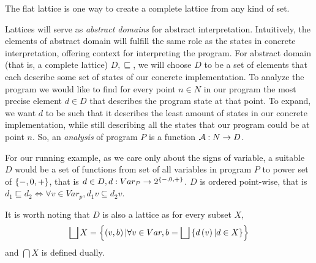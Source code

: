 \documentclass[..thesis.tex]{subfiles}
\begin{document}
The flat lattice is one way to create a complete lattice from any kind of set.


Lattices will serve as \textit{abstract domains} for abstract interpretation. Intuitively, the elements of abstract domain will fulfill the same role as the states in concrete interpretation, offering context for interpreting the program. For abstract domain (that is, a complete lattice) $D,\sqsubseteq$, we will choose $D$ to be a set of elements that each describe some set of states of our concrete implementation. To analyze the program we would like to find for every point $n \in N$ in our program the most precise element $d \in D$ that describes the program state at that point. To expand, we want $d$ to be such that it describes the least amount of states in our concrete implementation, while still describing all the states that our program could be at point $n$. So, an \textit{analysis} of program $P$ is a function $\mathcal{A} : N \to D$.

For our running example, as we care only about the signs of variable, a suitable $D$ would be a set of functions from set of all variables in program $P$ to power set of $\left\lbrace -, 0, + \right\rbrace$, that is $d \in D, d : Var_P \to 2^{\left\lbrace -, 0, + \right\rbrace}$. 
$D$ is ordered point-wise, that is $d_1 \sqsubseteq d_2 \iff \forall v \in Var_p, d_1 v \subseteq d_2 v$. 


It is worth noting that $D$ is also a lattice as for every subset $X$,
\begin{equation*}
  \bigsqcup X = \left\lbrace \left( v, b \right) | \forall v \in Var, b = \bigsqcup \left\lbrace d \left( v \right) | d \in X \right\rbrace \right\rbrace
\end{equation*}
and $\bigcap X$ is defined dually.

\end{document}
